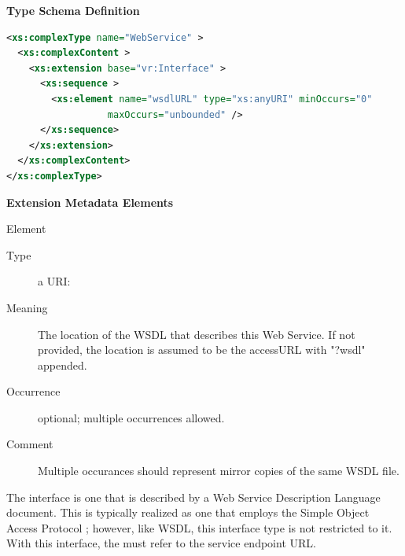 \documentclass[11pt,a4paper]{ivoa}
\begin{document}

\vspace{1ex}\noindent\textbf{ Type Schema Definition}

\begin{lstlisting}[language=XML,basicstyle=\footnotesize]
<xs:complexType name="WebService" >
  <xs:complexContent >
    <xs:extension base="vr:Interface" >
      <xs:sequence >
        <xs:element name="wsdlURL" type="xs:anyURI" minOccurs="0"
                  maxOccurs="unbounded" />
      </xs:sequence>
    </xs:extension>
  </xs:complexContent>
</xs:complexType>
\end{lstlisting}

\vspace{0.5ex}\noindent\textbf{ Extension Metadata Elements}

\begingroup\small\begin{bigdescription}\item[Element \xmlel{wsdlURL}]
\begin{description}
\item[Type] a URI: 
\item[Meaning] 
                        The location of the WSDL that describes this
                        Web Service.  If not provided, the location is 
                        assumed to be the accessURL with {"}?wsdl{"} appended.
                     
\item[Occurrence] optional; multiple occurrences allowed.
\item[Comment] 
                        Multiple occurances should represent mirror copies of 
                        the same WSDL file.  
                     

\end{description}


\end{bigdescription}\endgroup

\endgroup

The  interface is one that is described by a Web
Service Description Language \citep{booth07} document. This is typically
realized as one that employs the Simple Object Access Protocol
\citep{std:SOAP}; however, like WSDL, this interface type is not
restricted to it. With this interface, the  must
refer to the service endpoint URL.
\end{document}

